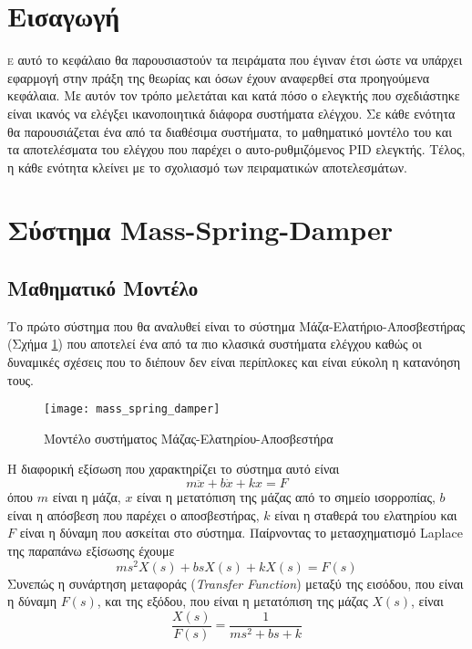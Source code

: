 


\section{Εισαγωγή}

\lettrine[findent=2pt]{}{ε} αυτό το κεφάλαιο θα παρουσιαστούν τα πειράματα που έγιναν έτσι ώστε να υπάρχει εφαρμογή στην πράξη της θεωρίας και όσων έχουν αναφερθεί στα προηγούμενα κεφάλαια. Με αυτόν τον τρόπο μελετάται και κατά πόσο ο ελεγκτής που σχεδιάστηκε είναι ικανός να ελέγξει ικανοποιητικά διάφορα συστήματα ελέγχου. Σε κάθε ενότητα θα παρουσιάζεται ένα από τα διαθέσιμα συστήματα, το μαθηματικό μοντέλο του και τα αποτελέσματα του ελέγχου που παρέχει ο αυτο-ρυθμιζόμενος PID ελεγκτής. Τέλος, η κάθε ενότητα κλείνει με το σχολιασμό των πειραματικών αποτελεσμάτων.

\section{Σύστημα Mass-Spring-Damper}

\subsection{Μαθηματικό Μοντέλο}

Το πρώτο σύστημα που θα αναλυθεί είναι το σύστημα Μάζα-Ελατήριο-Αποσβεστήρας (Σχήμα \ref{fig:mass_spring_damper}) που αποτελεί ένα από τα πιο κλασικά συστήματα ελέγχου καθώς οι δυναμικές σχέσεις που το διέπουν δεν είναι περίπλοκες και είναι εύκολη η κατανόηση τους.

\begin{figure}[h]
  \centering
  \texttt{[image: mass\_spring\_damper]}
  \caption{Μοντέλο συστήματος Μάζας-Ελατηρίου-Αποσβεστήρα}
  \label{fig:mass_spring_damper}
\end{figure}

\noindent
H διαφορική εξίσωση που χαρακτηρίζει το σύστημα αυτό είναι
\begin{equation}
m\ddot{x} + b\dot{x} + kx = F
\label{eq:mass_springer_damper_ode}
\end{equation}
όπου $m$ είναι η μάζα, $x$ είναι η μετατόπιση της μάζας από το σημείο ισορροπίας, $b$ είναι η απόσβεση που παρέχει ο αποσβεστήρας, $k$ είναι η σταθερά του ελατηρίου και $F$ είναι η δύναμη που ασκείται στο σύστημα. Παίρνοντας το μετασχηματισμό Laplace της παραπάνω εξίσωσης έχουμε
\begin{equation}
ms^2X(s) + bsX(s) + kX(s) = F(s)
\label{eq:mass_springer_damper_laplace}
\end{equation}
Συνεπώς η συνάρτηση μεταφοράς (\emph{Transfer Function}) μεταξύ της εισόδου, που είναι η δύναμη $F(s)$, και της εξόδου, που είναι η μετατόπιση της μάζας $X(s)$, είναι
\begin{equation}
\frac{X(s)}{F(s)} = \frac{1}{ms^2 + bs + k}
\end{equation}


